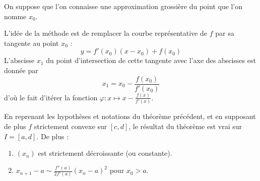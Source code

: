   \begin{remark}
    On suppose que l'on connaisse une approximation grossière du point que l'on nomme $x_0$.
    \begin{center}
    \end{center}
    L'idée de la méthode est de remplacer la courbe représentative de $f$ par sa tangente au point $x_0$ :
    \[ y = f'(x_0)(x-x_0) + f(x_0) \]
    L'abscisse $x_1$ du point d'intersection de cette tangente avec l'axe des abscisses est donnée par
    \[ x_1 = x_0 - \frac{f(x_0)}{f'(x_0)} \]
    d'où le fait d'itérer la fonction $\varphi : x \mapsto x - \frac{f(x)}{f'(x)}$.
  \end{remark}


  \begin{corollary}
    En reprenant les hypothèses et notations du théorème précédent, et en supposant de plus $f$ strictement convexe sur $[c, d]$, le résultat du théorème est vrai sur $I = [a, d]$. De plus :
    \begin{enumerate}[label=(\roman*)]
      \item $(x_n)$ est strictement décroissante (ou constante).
      \item $x_{n+1} - a \sim \frac{f''(a)}{2f'(a)} (x_n - a)^2$ pour $x_0 > a$.
    \end{enumerate}
  \end{corollary}

